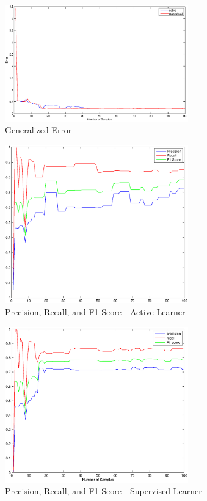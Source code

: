 \documentclass[12pt]{article}
\begin{document}
\begin{figure}
	\centering
	\includegraphics[width=300px]{generr}
	\caption{Generalized Error}
	\label{fig:generr}
\end{figure}

\begin{figure}
	\centering
	\includegraphics[width=300px]{precisionrecall}
	\caption{Precision, Recall, and F1 Score - Active Learner}
	\label{fig:precisionrecall}
\end{figure}

\begin{figure}
	\centering
	\includegraphics[width=300px]{precisionrecallSup}
	\caption{Precision, Recall, and F1 Score - Supervised Learner}
	\label{fig:precisionrecallSup}
\end{figure}
\end{document}
